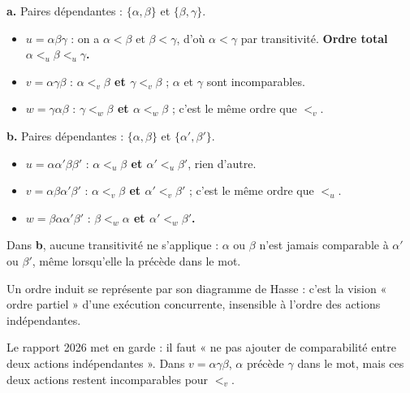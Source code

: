 \documentclass[11pt,a4paper]{article}
\providecommand{\tightlist}{\setlength{\itemsep}{0pt}\setlength{\parskip}{0pt}}
\begin{document}
\textbf{a.} Paires dépendantes : \(\{\alpha,\beta\}\) et \(\{\beta,\gamma\}\).

\begin{itemize}
\tightlist
\item
  \(u=\alpha\beta\gamma\) : on a \(\alpha<\beta\) et \(\beta<\gamma\), d'où \(\alpha<\gamma\) par transitivité. \textbf{Ordre total \(\alpha<_u\beta<_u\gamma\).}
\item
  \(v=\alpha\gamma\beta\) : \textbf{\(\alpha<_v\beta\) et \(\gamma<_v\beta\)} ; \(\alpha\) et \(\gamma\) sont incomparables.
\item
  \(w=\gamma\alpha\beta\) : \textbf{\(\gamma<_w\beta\) et \(\alpha<_w\beta\)} ; c'est le même ordre que \(<_v\).
\end{itemize}

\textbf{b.} Paires dépendantes : \(\{\alpha,\beta\}\) et \(\{\alpha',\beta'\}\).

\begin{itemize}
\tightlist
\item
  \(u=\alpha\alpha'\beta\beta'\) : \textbf{\(\alpha<_u\beta\) et \(\alpha'<_u\beta'\)}, rien d'autre.
\item
  \(v=\alpha\beta\alpha'\beta'\) : \textbf{\(\alpha<_v\beta\) et \(\alpha'<_v\beta'\)} ; c'est le même ordre que \(<_u\).
\item
  \(w=\beta\alpha\alpha'\beta'\) : \textbf{\(\beta<_w\alpha\) et \(\alpha'<_w\beta'\).}
\end{itemize}

Dans \textbf{b}, aucune transitivité ne s'applique : \(\alpha\) ou \(\beta\) n'est jamais comparable à \(\alpha'\) ou \(\beta'\), même lorsqu'elle la précède dans le mot.

\begin{methode}

Un ordre induit se représente par son diagramme de Hasse : c'est la vision « ordre partiel » d'une exécution concurrente, insensible à l'ordre des actions indépendantes.

\end{methode}

\begin{piege}

Le rapport 2026 met en garde : il faut « ne pas ajouter de comparabilité entre deux actions indépendantes ». Dans \(v=\alpha\gamma\beta\), \(\alpha\) précède \(\gamma\) dans le mot, mais ces deux actions restent incomparables pour \(<_v\).

\end{piege}
\end{document}
